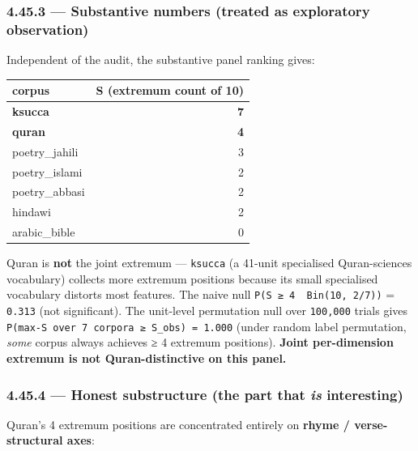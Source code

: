 \documentclass[
]{article}
\newcounter{none} %
\begin{document}
\subsubsection{4.45.3 --- Substantive numbers (treated as exploratory
observation)}\label{substantive-numbers-treated-as-exploratory-observation}

Independent of the audit, the substantive panel ranking gives:

{\def\LTcaptype{none} %
\begin{longtable}[]{@{}lr@{}}
\toprule\noalign{}
corpus & S (extremum count of 10) \\
\midrule\noalign{}
\endhead
\bottomrule\noalign{}
\endlastfoot
\textbf{ksucca} & \textbf{7} \\
\textbf{quran} & \textbf{4} \\
poetry\_jahili & 3 \\
poetry\_islami & 2 \\
poetry\_abbasi & 2 \\
hindawi & 2 \\
arabic\_bible & 0 \\
\end{longtable}
}

Quran is \textbf{not} the joint extremum --- \texttt{ksucca} (a 41-unit
specialised Quran-sciences vocabulary) collects more extremum positions
because its small specialised vocabulary distorts most features. The
naive null \texttt{P(S\ ≥\ 4\ \textbar{}\ Bin(10,\ 2/7))} =
\texttt{0.313} (not significant). The unit-level permutation null over
\texttt{100,000} trials gives
\texttt{P(max-S\ over\ 7\ corpora\ ≥\ S\_obs)\ =\ 1.000} (under random
label permutation, \emph{some} corpus always achieves ≥ 4 extremum
positions). \textbf{Joint per-dimension extremum is not
Quran-distinctive on this panel.}

\subsubsection{\texorpdfstring{4.45.4 --- Honest substructure (the part
that \emph{is}
interesting)}{4.45.4 --- Honest substructure (the part that is interesting)}}\label{honest-substructure-the-part-that-is-interesting}

Quran's 4 extremum positions are concentrated entirely on \textbf{rhyme
/ verse-structural axes}:
\end{document}
